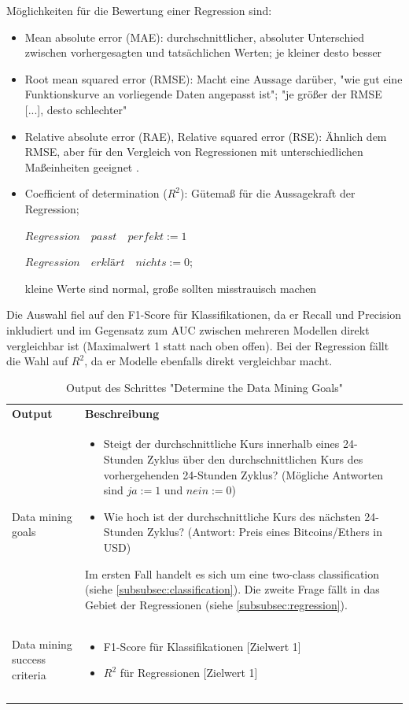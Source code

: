 Möglichkeiten für die Bewertung einer Regression sind:
\begin{itemize}
\item Mean absolute error (MAE): durchschnittlicher, absoluter Unterschied zwischen vorhergesagten und tatsächlichen Werten; je kleiner desto besser\citep{mircosoft_evaluate_2017}
\item Root mean squared error (RMSE): Macht eine Aussage darüber, "wie gut eine Funktionskurve an vorliegende Daten angepasst ist"; "je größer der RMSE [...], desto schlechter"\citep{statista_root_nodate}
\item Relative absolute error (RAE), Relative squared error (RSE): Ähnlich dem RMSE, aber für den Vergleich von Regressionen mit unterschiedlichen Maßeinheiten geeignet \citep{dr._sayad_model_2017}.
\item Coefficient of determination ($ R^2 $): Gütemaß für die Aussagekraft der Regression; 
\par
$Regression \quad passt \quad perfekt := 1$ 
\par 
$Regression \quad erklärt \quad nichts := 0$;
\par 
kleine Werte sind normal, große sollten misstrauisch machen\citep{mircosoft_evaluate_2017}
\end{itemize}
Die Auswahl fiel auf den F1-Score für Klassifikationen, da er Recall und Precision inkludiert und im Gegensatz zum AUC zwischen mehreren Modellen direkt vergleichbar ist (Maximalwert 1 statt nach oben offen). Bei der Regression fällt die Wahl auf $ R^2 $, da er Modelle ebenfalls direkt vergleichbar macht.

\begin{centering} \footnotesize \begin{longtable}[!h]{|p{}|p{12cm}|}
\hline
\textbf{Output} & \textbf{Beschreibung} \\ 
\hhline{==}
Data mining goals & \begin{itemize}
\item Steigt der durchschnittliche Kurs innerhalb eines 24-Stunden Zyklus über den durchschnittlichen Kurs des vorhergehenden 24-Stunden Zyklus? (Mögliche Antworten sind $ja := 1$ und $nein := 0$) 
\item Wie hoch ist der durchschnittliche Kurs des nächsten 24-Stunden Zyklus? (Antwort: Preis eines Bitcoins/Ethers in USD)
\end{itemize} 
Im ersten Fall handelt es sich um eine two-class classification (siehe \ref{subsubsec:classification}). Die zweite Frage fällt in das Gebiet der Regressionen (siehe \ref{subsubsec:regression}). \\
\hline
Data mining success criteria &\begin{itemize}
\item F1-Score für Klassifikationen [Zielwert 1]
\item $ R^2 $ für Regressionen [Zielwert 1]
\end{itemize} \\
\\
\hline
\caption{Output des Schrittes "Determine the Data Mining Goals"} \label{tab:goalsSuccess}
\end{longtable} \end{centering}

